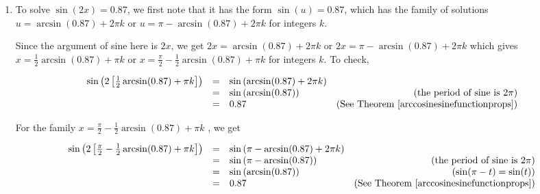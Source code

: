 \documentclass{ximera}
\begin{document}
\begin{example}
\begin{explanation}
\begin{enumerate}
 

Advancing $k$ to $2$ produces $x = 2\arctan(-3) + 4\pi$. Once again, we get from $-\pi < 2\arctan(-3) < 0$ that $3\pi < 2\arctan(-3) + 4\pi < 4\pi$.  Since this is outside the interval of interest, $[0,2\pi)$,  we discard $x = 2\arctan(-3) + 4\pi$ and all solutions of the form $x = 2\arctan(-3) + 2\pi k$ for $k > 2$.   

 

Graphically, $y = \tan\left(\frac{x}{2}\right)$ and $y = -3$ intersect only once on $[0,2\pi)$ at $x = 2\arctan(-3) + 2\pi\approx 3.785$.

 
\begin{center}
\end{center}

\item To solve $\sin(2x) = 0.87$, we first note that it has the form $\sin(u) = 0.87$, which has the family of solutions $u = \arcsin(0.87) + 2\pi k$ or $u =\pi -  \arcsin(0.87) + 2\pi k$ for integers $k$. 

 

Since the argument of sine here is $2x$, we get $2x = \arcsin(0.87) + 2\pi k$ or $2x =\pi -  \arcsin(0.87) + 2\pi k$ which gives $x = \frac{1}{2} \arcsin(0.87) + \pi k$ or $x =\frac{\pi}{2} -  \frac{1}{2}\arcsin(0.87) + \pi k$ for integers $k$.  To check,

\[ \begin{array}{rclr}

\sin\left(2\left[\frac{1}{2} \arcsin(0.87) + \pi k\right]\right)  &  = & \sin\left(\arcsin(0.87) + 2\pi k\right)  & \\   & =  & \sin\left(\arcsin(0.87)\right) & \text{(the period of sine is $2\pi$)} \\   
& =  & 0.87& (\text{See Theorem } \ref{arccosinesinefunctionprops})\\

\end{array}\] 



For the family $x =\frac{\pi}{2} -  \frac{1}{2}\arcsin(0.87) + \pi k$ , we get

\[ \begin{array}{rclr}

\sin\left(2\left[\frac{\pi}{2} - \frac{1}{2} \arcsin(0.87) + \pi k\right]\right)  &  = & \sin\left(\pi - \arcsin(0.87) + 2\pi k\right) & \\   
& =  & \sin\left(\pi - \arcsin(0.87)\right) & \text{(the period of sine is $2\pi$)} \\   
& =  & \sin\left(\arcsin(0.87)\right) & \text{($\sin(\pi - t) = \sin(t)$)} \\   
& =  & 0.87& (\text{See Theorem } \ref{arccosinesinefunctionprops}) \\
												

\end{array}\]
\end{enumerate}
\end{explanation}
\end{example}
\end{document}

